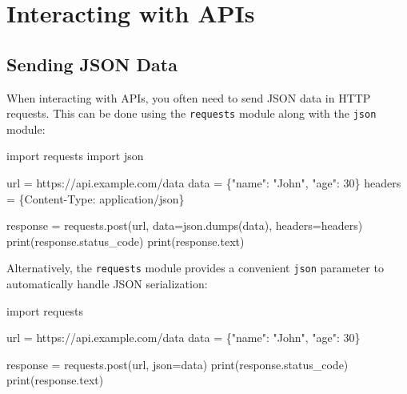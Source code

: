 \documentclass[
  letterpaper,
  DIV=11,
  numbers=noendperiod]{scrreprt}
\newenvironment{Shaded}{\begin{snugshade}}{\end{snugshade}}
\newcommand{\BuiltInTok}[1]{\textcolor[rgb]{0.00,0.23,0.31}{#1}}
\newcommand{\DecValTok}[1]{\textcolor[rgb]{0.68,0.00,0.00}{#1}}
\newcommand{\ImportTok}[1]{\textcolor[rgb]{0.00,0.46,0.62}{#1}}
\newcommand{\NormalTok}[1]{\textcolor[rgb]{0.00,0.23,0.31}{#1}}
\newcommand{\OperatorTok}[1]{\textcolor[rgb]{0.37,0.37,0.37}{#1}}
\newcommand{\StringTok}[1]{\textcolor[rgb]{0.13,0.47,0.30}{#1}}
\begin{document}
\section{Interacting with APIs}\label{interacting-with-apis}

\subsection{Sending JSON Data}\label{sending-json-data}

When interacting with APIs, you often need to send JSON data in HTTP
requests. This can be done using the \texttt{requests} module along with
the \texttt{json} module:

\begin{Shaded}
\begin{Highlighting}[]
\ImportTok{import}\NormalTok{ requests}
\ImportTok{import}\NormalTok{ json}

\NormalTok{url }\OperatorTok{=} \StringTok{\textquotesingle{}https://api.example.com/data\textquotesingle{}}
\NormalTok{data }\OperatorTok{=}\NormalTok{ \{}\StringTok{"name"}\NormalTok{: }\StringTok{"John"}\NormalTok{, }\StringTok{"age"}\NormalTok{: }\DecValTok{30}\NormalTok{\}}
\NormalTok{headers }\OperatorTok{=}\NormalTok{ \{}\StringTok{\textquotesingle{}Content{-}Type\textquotesingle{}}\NormalTok{: }\StringTok{\textquotesingle{}application/json\textquotesingle{}}\NormalTok{\}}

\NormalTok{response }\OperatorTok{=}\NormalTok{ requests.post(url, data}\OperatorTok{=}\NormalTok{json.dumps(data), headers}\OperatorTok{=}\NormalTok{headers)}
\BuiltInTok{print}\NormalTok{(response.status\_code)}
\BuiltInTok{print}\NormalTok{(response.text)}
\end{Highlighting}
\end{Shaded}

Alternatively, the \texttt{requests} module provides a convenient
\texttt{json} parameter to automatically handle JSON serialization:

\begin{Shaded}
\begin{Highlighting}[]
\ImportTok{import}\NormalTok{ requests}

\NormalTok{url }\OperatorTok{=} \StringTok{\textquotesingle{}https://api.example.com/data\textquotesingle{}}
\NormalTok{data }\OperatorTok{=}\NormalTok{ \{}\StringTok{"name"}\NormalTok{: }\StringTok{"John"}\NormalTok{, }\StringTok{"age"}\NormalTok{: }\DecValTok{30}\NormalTok{\}}

\NormalTok{response }\OperatorTok{=}\NormalTok{ requests.post(url, json}\OperatorTok{=}\NormalTok{data)}
\BuiltInTok{print}\NormalTok{(response.status\_code)}
\BuiltInTok{print}\NormalTok{(response.text)}
\end{Highlighting}
\end{Shaded}
\end{document}
